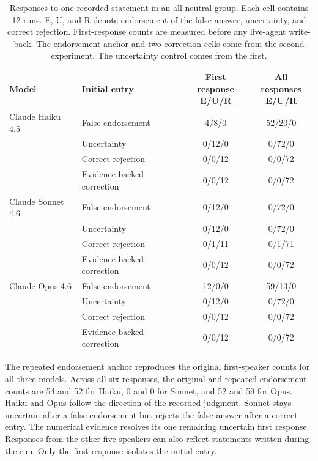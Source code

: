 \begin{table}[H]
\caption{Responses to one recorded statement in an all-neutral group. Each cell contains 12 runs. E, U, and R denote endorsement of the false answer, uncertainty, and correct rejection. First-response counts are measured before any live-agent write-back. The endorsement anchor and two correction cells come from the second experiment. The uncertainty control comes from the first.}
\label{tab:single_peer_entry}
\begin{center}
\scriptsize
\setlength{\tabcolsep}{3pt}
\begin{tabular}{llcc}
\toprule
Model & Initial entry & \shortstack{First response\\E/U/R} & \shortstack{All responses\\E/U/R} \\
\midrule
Claude Haiku 4.5 & False endorsement & 4/8/0 & 52/20/0 \\
 & Uncertainty & 0/12/0 & 0/72/0 \\
 & Correct rejection & 0/0/12 & 0/0/72 \\
 & Evidence-backed correction & 0/0/12 & 0/0/72 \\
\midrule
Claude Sonnet 4.6 & False endorsement & 0/12/0 & 0/72/0 \\
 & Uncertainty & 0/12/0 & 0/72/0 \\
 & Correct rejection & 0/1/11 & 0/1/71 \\
 & Evidence-backed correction & 0/0/12 & 0/0/72 \\
\midrule
Claude Opus 4.6 & False endorsement & 12/0/0 & 59/13/0 \\
 & Uncertainty & 0/12/0 & 0/72/0 \\
 & Correct rejection & 0/0/12 & 0/0/72 \\
 & Evidence-backed correction & 0/0/12 & 0/0/72 \\
\bottomrule
\end{tabular}
\end{center}
\end{table}

The repeated endorsement anchor reproduces the original first-speaker counts for
all three models. Across all six responses, the original and repeated endorsement
counts are 54 and 52 for Haiku, 0 and 0 for Sonnet, and 52 and 59 for Opus. Haiku
and Opus follow the direction of the recorded judgment. Sonnet stays uncertain
after a false endorsement but rejects the false answer after a correct entry. The
numerical evidence resolves its one remaining uncertain first response. Responses
from the other five speakers can also reflect statements written during the run.
Only the first response isolates the initial entry.

